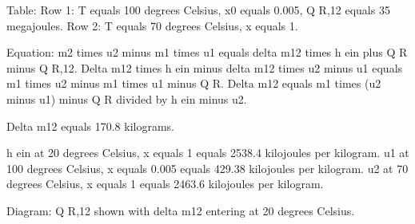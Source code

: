 Table:  
Row 1: T equals 100 degrees Celsius, x0 equals 0.005, Q R,12 equals 35 megajoules.  
Row 2: T equals 70 degrees Celsius, x equals 1.  

Equation:  
m2 times u2 minus m1 times u1 equals delta m12 times h ein plus Q R minus Q R,12.  
Delta m12 times h ein minus delta m12 times u2 minus u1 equals m1 times u2 minus m1 times u1 minus Q R.  
Delta m12 equals m1 times (u2 minus u1) minus Q R divided by h ein minus u2.  

Delta m12 equals 170.8 kilograms.  

h ein at 20 degrees Celsius, x equals 1 equals 2538.4 kilojoules per kilogram.  
u1 at 100 degrees Celsius, x equals 0.005 equals 429.38 kilojoules per kilogram.  
u2 at 70 degrees Celsius, x equals 1 equals 2463.6 kilojoules per kilogram.  

Diagram: Q R,12 shown with delta m12 entering at 20 degrees Celsius.
